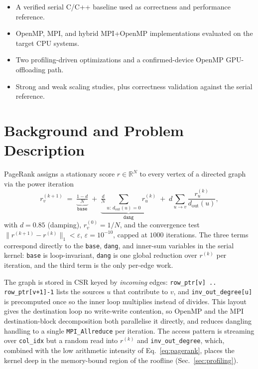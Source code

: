 \documentclass[11pt]{article}
\begin{document}
\begin{itemize}\itemsep0pt
    \item A verified serial C/C++ baseline used as correctness and performance reference.
    \item OpenMP, MPI, and hybrid MPI+OpenMP implementations evaluated on the target CPU systems.
    \item Two profiling-driven optimizations and a confirmed-device OpenMP GPU-offloading path.
    \item Strong and weak scaling studies, plus correctness validation against the serial reference.
\end{itemize}

\section{Background and Problem Description}
\label{sec:background}

PageRank assigns a stationary score $r\in\mathbb{R}^{N}$ to every vertex of a
directed graph via the power iteration
\begin{equation}
\label{eq:pagerank}
r^{(k+1)}_{v}\;=\;\underbrace{\tfrac{1-d}{N}}_{\texttt{base}}
\;+\;\underbrace{\tfrac{d}{N}\!\!\sum_{u:\,d_{\mathrm{out}}(u)=0}\!\!r^{(k)}_{u}}_{\texttt{dang}}
\;+\;d\!\sum_{u\to v}\!\frac{r^{(k)}_{u}}{d_{\mathrm{out}}(u)},
\end{equation}
with $d=0.85$ (damping), $r^{(0)}_{v}=1/N$, and the convergence test
$\lVert r^{(k+1)}-r^{(k)}\rVert_{1}<\varepsilon$, $\varepsilon=10^{-10}$,
capped at $1000$ iterations. The three terms correspond directly to the
\texttt{base}, \texttt{dang}, and inner-sum variables in the serial kernel:
\texttt{base} is loop-invariant, \texttt{dang} is one global reduction over
$r^{(k)}$ per iteration, and the third term is the only per-edge work.

The graph is stored in CSR keyed by \emph{incoming} edges:
\texttt{row\_ptr[v]\,..\,row\_ptr[v+1]-1} lists the sources $u$ that
contribute to $v$, and \texttt{inv\_out\_degree[u]} is precomputed once so
the inner loop multiplies instead of divides. This layout gives the
destination loop no write-write contention, so OpenMP and the MPI
destination-block decomposition both parallelise it directly, and reduces
dangling handling to a single \texttt{MPI\_Allreduce} per iteration. The
access pattern is streaming over \texttt{col\_idx} but a random read into
$r^{(k)}$ and \texttt{inv\_out\_degree}, which, combined with the low
arithmetic intensity of Eq.~\ref{eq:pagerank}, places the kernel deep in the
memory-bound region of the roofline (Sec.~\ref{sec:profiling}).
\end{document}
